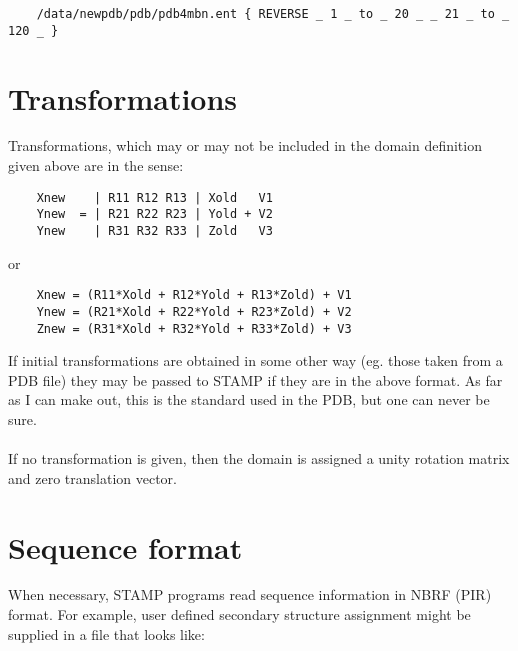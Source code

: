     \begin{scriptsize}\begin{verbatim}
    /data/newpdb/pdb/pdb4mbn.ent { REVERSE _ 1 _ to _ 20 _ _ 21 _ to _ 120 _ } 
    \end{verbatim} \end{scriptsize}


    \section{Transformations}

    Transformations, which may or may not be included in the domain 
    definition given above are in the sense:\\

    \begin{scriptsize}\begin{verbatim}
    Xnew    | R11 R12 R13 | Xold   V1
    Ynew  = | R21 R22 R23 | Yold + V2
    Ynew    | R31 R32 R33 | Zold   V3
    \end{verbatim} \end{scriptsize}

    or\\

    \begin{scriptsize}\begin{verbatim}
    Xnew = (R11*Xold + R12*Yold + R13*Zold) + V1
    Ynew = (R21*Xold + R22*Yold + R23*Zold) + V2
    Znew = (R31*Xold + R32*Yold + R33*Zold) + V3
    \end{verbatim} \end{scriptsize}

    If initial transformations are obtained in some other way (eg.
    those taken from a PDB file) they may be passed to STAMP if they
    are in the above format.  As far as I can make out, this is the
    standard used in the PDB, but one can never be sure.  \\
    \\
    If no transformation is given, then the domain is assigned a
    unity rotation matrix and zero translation vector.

    \section{Sequence format}

    When necessary, STAMP programs read sequence information in  NBRF (PIR) 
    format.  For example, user defined secondary structure assignment 
    might be supplied in a file that looks like:\\

